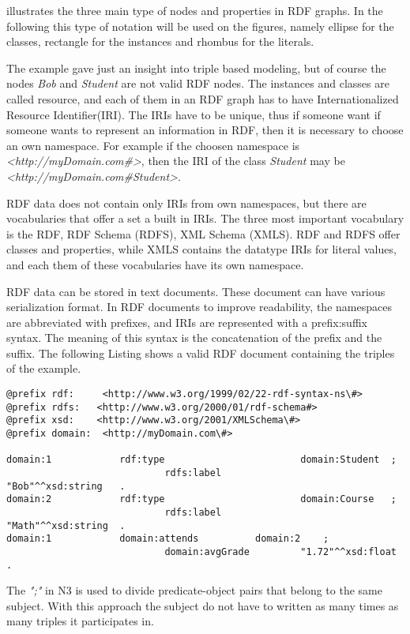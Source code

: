  illustrates the three main type of nodes and properties in RDF graphs. In the following this type of notation will be used on the figures, namely ellipse for the classes, rectangle for the instances and rhombus for the literals.


The example gave just an insight into triple based modeling, but of course the nodes \textit{Bob} and \textit{Student} are not valid RDF nodes. The instances and classes are called resource, and each of them in an RDF graph has to have Internationalized Resource Identifier(IRI). The IRIs have to be unique, thus if someone want if someone wants to represent an information in RDF, then it is necessary to choose an own namespace. For example if the choosen namespace is \textit{<http://myDomain.com\#>}, then the IRI of the class \textit{Student} may be \textit{<http://myDomain.com\#Student>}.


RDF data does not contain only IRIs from own namespaces, but there are vocabularies that offer a set a built in IRIs. The three most important vocabulary is the RDF, RDF Schema (RDFS), XML Schema (XMLS).  RDF and RDFS offer classes and properties, while XMLS contains the datatype IRIs for literal values, and each them of these vocabularies have its own namespace.

RDF data can be stored in text documents. These document can have various serialization format. In RDF documents to improve readability, the namespaces are abbreviated with prefixes, and IRIs are represented with a prefix:suffix syntax. The meaning of this syntax is the concatenation of the prefix and the suffix. The following Listing shows a valid RDF document containing the triples of the example.

\begin{lstlisting}[basicstyle=\footnotesize, captionpos=b, caption=RDF data in N3 serialization format, label=lst:sparql,
frame=single]
@prefix rdf:  	 <http://www.w3.org/1999/02/22-rdf-syntax-ns\#>
@prefix rdfs:   <http://www.w3.org/2000/01/rdf-schema#>
@prefix xsd:  	<http://www.w3.org/2001/XMLSchema\#>
@prefix domain:  <http://myDomain.com\#>

domain:1			rdf:type						domain:Student 	;
							rdfs:label					"Bob"^^xsd:string 	.
domain:2			rdf:type						domain:Course 	;
							rdfs:label					"Math"^^xsd:string 	.
domain:1			domain:attends			domain:2 	;
							domain:avgGrade			"1.72"^^xsd:float .
\end{lstlisting}

The \textit{";"} in N3 is used to divide predicate-object pairs that belong to the same subject. With this approach the subject do not have to written as many times as many triples it participates in.

